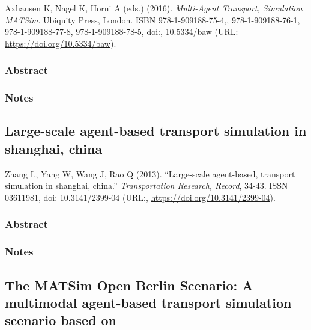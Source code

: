 \documentclass[
]{article}
\begin{document}
Axhausen K, Nagel K, Horni A (eds.) (2016). \emph{Multi-Agent Transport,
Simulation MATSim}. Ubiquity Press, London. ISBN 978-1-909188-75-4,,
978-1-909188-76-1, 978-1-909188-77-8, 978-1-909188-78-5, doi:,
10.5334/baw (URL: \url{https://doi.org/10.5334/baw}).

\hypertarget{abstract-23}{%
\subsubsection{Abstract}\label{abstract-23}}

\hypertarget{notes-23}{%
\subsubsection{Notes}\label{notes-23}}

\hypertarget{large-scale-agent-based-transport-simulation-in-shanghai-china}{%
\subsection{Large-scale agent-based transport simulation in shanghai,
china}\label{large-scale-agent-based-transport-simulation-in-shanghai-china}}

Zhang L, Yang W, Wang J, Rao Q (2013). ``Large-scale agent-based,
transport simulation in shanghai, china.'' \emph{Transportation
Research, Record}, 34-43. ISSN 03611981, doi: 10.3141/2399-04 (URL:,
\url{https://doi.org/10.3141/2399-04}).

\hypertarget{abstract-24}{%
\subsubsection{Abstract}\label{abstract-24}}

\hypertarget{notes-24}{%
\subsubsection{Notes}\label{notes-24}}

\hypertarget{the-matsim-open-berlin-scenario-a-multimodal-agent-based-transport-simulation-scenario-based-on}{%
\subsection{The MATSim Open Berlin Scenario: A multimodal agent-based
transport simulation scenario based
on}\label{the-matsim-open-berlin-scenario-a-multimodal-agent-based-transport-simulation-scenario-based-on}}
\end{document}
